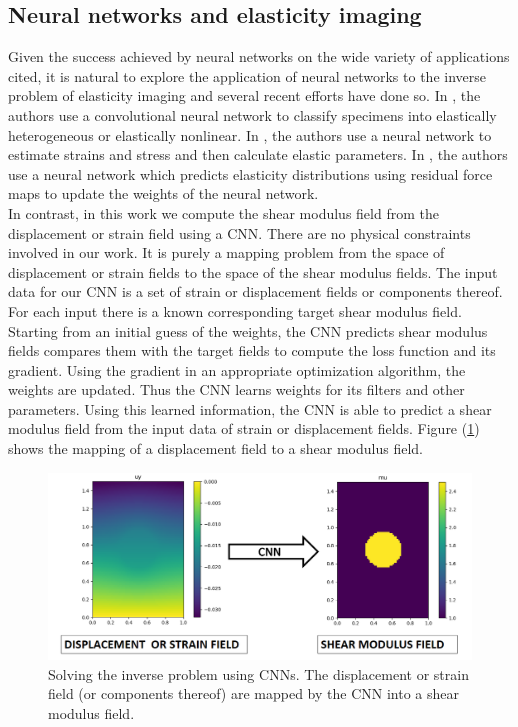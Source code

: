 \documentclass[12pt]{article}
\begin{document}
\subsection{Neural networks and elasticity imaging}
Given the success achieved by neural networks on the wide variety of applications cited, it is natural to explore the application of neural networks to the inverse problem of elasticity imaging and several recent efforts \cite{paper:pateloberai2019,misc:gu2020,paper:hoeriginsana2016} have done so. In \cite{paper:pateloberai2019}, the authors use a convolutional neural network to classify specimens into elastically heterogeneous or elastically nonlinear. In \cite{paper:hoeriginsana2016}, the authors use a neural network to estimate strains and stress and then calculate elastic parameters. In \cite{misc:gu2020}, the authors use a neural network which predicts elasticity distributions using residual force maps to update the weights of the neural network. \\In contrast, in this work we compute the shear modulus field from the displacement or strain field using a CNN. There are no physical constraints involved in our work. It is purely a mapping problem from the space of displacement or strain fields to the space of the shear modulus fields. The input data for our CNN is a set of strain or displacement fields or components thereof. For each input there is a known corresponding target shear modulus field. Starting from an initial guess of the weights, the CNN predicts shear modulus fields compares them with the target fields to compute the loss function and its gradient. Using the gradient in an appropriate optimization algorithm, the weights are updated. Thus the CNN learns weights for its filters and other parameters. Using this learned information, the CNN is able to predict a shear modulus field from the input data of strain or displacement fields. Figure (\ref{fig:schematic_inv}) shows the mapping of a displacement field to a shear modulus field.
%
\begin{figure}[h]
   \centering
    \includegraphics[totalheight=5cm]{Figures/schematic_inv/schematic_inv.png}
  \caption{\label{fig:schematic_inv} Solving the inverse problem using CNNs. The displacement or strain field (or components thereof) are mapped by the CNN into a shear modulus field.}
\end{figure}
%
\end{document}
